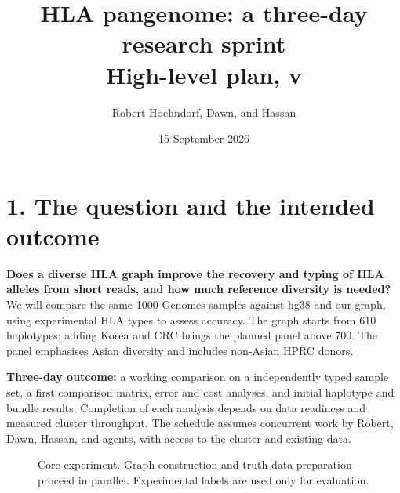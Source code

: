 \documentclass[11pt,a4paper]{article}
\title{HLA pangenome: a three-day research sprint\\\large High-level plan, v\planversion}
\author{Robert Hoehndorf, Dawn, and Hassan}
\date{15 September 2026}
\begin{document}
\maketitle
\vspace{-1.5em}

\section*{1. The question and the intended outcome}
\textbf{Does a diverse HLA graph improve the recovery and typing of HLA alleles
from short reads, and how much reference diversity is needed?}
We will compare the same 1000 Genomes samples against hg38 and our graph,
using experimental HLA types to assess accuracy. The graph starts from 610
haplotypes; adding Korea and CRC brings the planned panel above 700.
The panel emphasises Asian diversity and includes non-Asian HPRC donors.

\textbf{Three-day outcome:} a working comparison on a independently typed
sample set, a first comparison matrix, error and cost analyses, and initial haplotype
and bundle results. Completion of each analysis depends on data readiness and
measured cluster throughput. The schedule assumes concurrent work by Robert, Dawn, Hassan, and
agents, with access to the cluster and existing data.

\begin{figure}[h!]
\centering
{}
\caption{Core experiment. Graph construction and truth-data preparation proceed
in parallel. Experimental labels are used only for evaluation.}
\end{figure}
\end{document}
